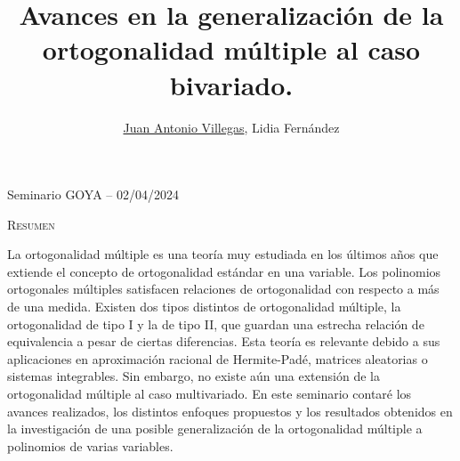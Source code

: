 \documentclass[11pt,a4paper]{amsart}
\newcommand{\head}{
{\noindent \small  Seminario GOYA -- 02/04/2024} \vspace{10pt}}
\begin{document}
\head \vspace{1cm}



\title{Avances en la generalización de la ortogonalidad múltiple al caso bivariado.}

\author{\underline{Juan Antonio Villegas}, Lidia Fernández}

\maketitle






\begin{center} \textsc{Resumen}
\end{center}



La ortogonalidad múltiple es una teoría muy estudiada en los últimos años que extiende el concepto de ortogonalidad estándar en una variable. Los polinomios ortogonales múltiples satisfacen relaciones de ortogonalidad con respecto a más de una medida. Existen dos tipos distintos de ortogonalidad múltiple, la ortogonalidad de tipo I y la de tipo II, que guardan una estrecha relación de equivalencia a pesar de ciertas diferencias. Esta teoría es relevante debido a sus aplicaciones en aproximación racional de Hermite-Padé, matrices aleatorias o sistemas integrables. Sin embargo, no existe aún una extensión de la ortogonalidad múltiple al caso multivariado. En este seminario contaré los avances realizados, los distintos enfoques propuestos y los resultados obtenidos en la investigación de una posible generalización de la ortogonalidad múltiple a polinomios de varias variables.
\end{document}
